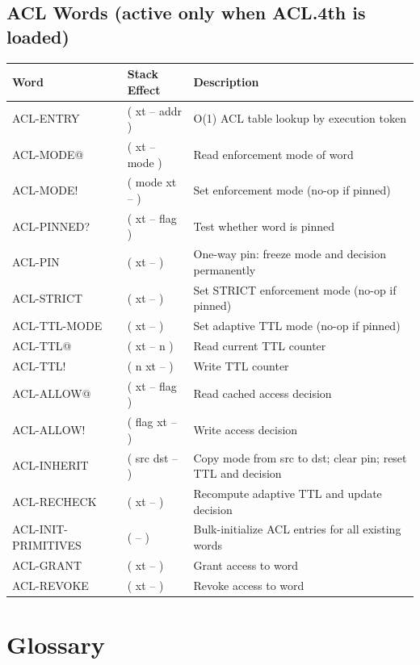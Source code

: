 \section*{ACL Words (active only when ACL.4th is loaded)}
\begin{longtable}{>{\ttfamily}lp{4.5cm}p{7cm}}
\toprule
\normalfont Word & Stack Effect & Description \\
\midrule
\endhead
\bottomrule
\endfoot
ACL-ENTRY       & ( xt -- addr )      & O(1) ACL table lookup by execution token \\
ACL-MODE@       & ( xt -- mode )      & Read enforcement mode of word \\
ACL-MODE!       & ( mode xt -- )      & Set enforcement mode (no-op if pinned) \\
ACL-PINNED?     & ( xt -- flag )      & Test whether word is pinned \\
ACL-PIN         & ( xt -- )           & One-way pin: freeze mode and decision permanently \\
ACL-STRICT      & ( xt -- )           & Set STRICT enforcement mode (no-op if pinned) \\
ACL-TTL-MODE    & ( xt -- )           & Set adaptive TTL mode (no-op if pinned) \\
ACL-TTL@        & ( xt -- n )         & Read current TTL counter \\
ACL-TTL!        & ( n xt -- )         & Write TTL counter \\
ACL-ALLOW@      & ( xt -- flag )      & Read cached access decision \\
ACL-ALLOW!      & ( flag xt -- )      & Write access decision \\
ACL-INHERIT     & ( src dst -- )      & Copy mode from src to dst; clear pin; reset TTL and decision \\
ACL-RECHECK     & ( xt -- )           & Recompute adaptive TTL and update decision \\
ACL-INIT-PRIMITIVES & ( -- )          & Bulk-initialize ACL entries for all existing words \\
ACL-GRANT       & ( xt -- )           & Grant access to word \\
ACL-REVOKE      & ( xt -- )           & Revoke access to word \\
\end{longtable}

\chapter{Glossary}
\label{app:glossary}

